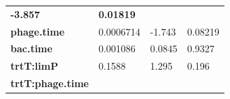 \documentclass[]{article}
\begin{document}
\begin{longtable}[]{@{}llll@{}}
\begin{minipage}[t]{0.13\columnwidth}
\textbf{-3.857}
\strut\end{minipage} &
\begin{minipage}[t]{0.16\columnwidth}\raggedright\strut
\textbf{0.01819}
\strut\end{minipage}\tabularnewline
\begin{minipage}[t]{0.43\columnwidth}\raggedright\strut
\textbf{phage.time}
\strut\end{minipage} &
\begin{minipage}[t]{0.17\columnwidth}\raggedright\strut
0.0006714
\strut\end{minipage} &
\begin{minipage}[t]{0.13\columnwidth}\raggedright\strut
-1.743
\strut\end{minipage} &
\begin{minipage}[t]{0.16\columnwidth}\raggedright\strut
0.08219
\strut\end{minipage}\tabularnewline
\begin{minipage}[t]{0.43\columnwidth}\raggedright\strut
\textbf{bac.time}
\strut\end{minipage} &
\begin{minipage}[t]{0.17\columnwidth}\raggedright\strut
0.001086
\strut\end{minipage} &
\begin{minipage}[t]{0.13\columnwidth}\raggedright\strut
0.0845
\strut\end{minipage} &
\begin{minipage}[t]{0.16\columnwidth}\raggedright\strut
0.9327
\strut\end{minipage}\tabularnewline
\begin{minipage}[t]{0.43\columnwidth}\raggedright\strut
\textbf{trtT:limP}
\strut\end{minipage} &
\begin{minipage}[t]{0.17\columnwidth}\raggedright\strut
0.1588
\strut\end{minipage} &
\begin{minipage}[t]{0.13\columnwidth}\raggedright\strut
1.295
\strut\end{minipage} &
\begin{minipage}[t]{0.16\columnwidth}\raggedright\strut
0.196
\strut\end{minipage}\tabularnewline
\begin{minipage}[t]{0.43\columnwidth}\raggedright\strut
\textbf{trtT:phage.time}
\strut\end{minipage} &
\begin{minipage}[t]{0.17\columnwidth}\raggedright\strut

\end{minipage}
\end{longtable}
\end{document}

